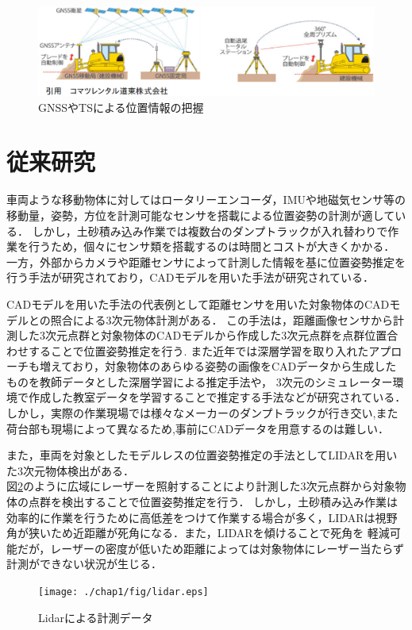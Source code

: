 \begin{figure}[b]
 \begin{center}
 \includegraphics[width=0.5\columnwidth]{./chap1/fig/gnss.eps}
 \caption{GNSSやTSによる位置情報の把握}
 \label{fig:GNSS}
 \end{center}
\end{figure}

\newpage

\section{従来研究}
車両ような移動物体に対してはロータリーエンコーダ，IMUや地磁気センサ等の移動量，姿勢，方位を計測可能なセンサを搭載による位置姿勢の計測が適している．
しかし，土砂積み込み作業では複数台のダンプトラックが入れ替わりで作業を行うため，個々にセンサ類を搭載するのは時間とコストが大きくかかる．
一方，外部からカメラや距離センサによって計測した情報を基に位置姿勢推定を行う手法が研究されており，CADモデルを用いた手法が研究されている\cite{中原智治2001}\cite{西卓郎2014}．
\par
CADモデルを用いた手法の代表例として距離センサを用いた対象物体のCADモデルとの照合による3次元物体計測がある\cite{林2008}．
この手法は，距離画像センサから計測した3次元点群と対象物体のCADモデルから作成した3次元点群を点群位置合わせすることで位置姿勢推定を行う.
また近年では深層学習を取り入れたアプローチも増えており，対象物体のあらゆる姿勢の画像をCADデータから生成したものを教師データとした深層学習による推定手法\cite{Sundermeyer2018}や，
3次元のシミュレーター環境で作成した教室データを学習することで推定する手法\cite{Tremblay2018}などが研究されている．
しかし，実際の作業現場では様々なメーカーのダンプトラックが行き交い,また荷台部も現場によって異なるため,事前にCADデータを用意するのは難しい．

また，車両を対象としたモデルレスの位置姿勢推定の手法としてLIDARを用いた3次元物体検出がある．\cite{Zhang2017}\cite{Chen2017}\cite{Lang2019}\\
図\ref{fig:Lidar}のように広域にレーザーを照射することにより計測した3次元点群から対象物体の点群を検出することで位置姿勢推定を行う．
しかし，土砂積み込み作業は効率的に作業を行うために高低差をつけて作業する場合が多く，LIDARは視野角が狭いため近距離が死角になる．また，LIDARを傾けることで死角を
軽減可能だが，レーザーの密度が低いため距離によっては対象物体にレーザー当たらず計測ができない状況が生じる．
\begin{figure}[b]
    \begin{center}
    \texttt{[image: ./chap1/fig/lidar.eps]}
    \caption{Lidarによる計測データ}
    \label{fig:Lidar}
    \end{center}
\end{figure}


